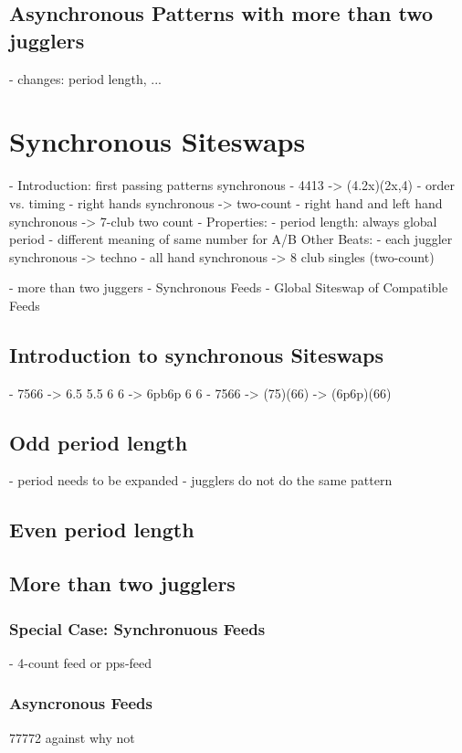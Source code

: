 \documentclass[a4paper,12pt,parskip=full]{scrreprt}
\begin{document}
	\section{Asynchronous Patterns with more than two jugglers}
	- changes: period length, ...
	\chapter{Synchronous Siteswaps}
	- Introduction: first passing patterns synchronous
	- 4413 -> (4.2x)(2x,4)
	- order vs. timing
	- right hands synchronous -> two-count
	- right hand and left hand synchronous -> 7-club two count
	- Properties:
	    - period length: always global period
	    - different meaning of same number for A/B
	Other Beats:
	- each juggler synchronous -> techno
	- all hand synchronous -> 8 club singles (two-count)
	
	- more than two juggers
	- Synchronous Feeds
	- Global Siteswap of Compatible Feeds
	
	\section{Introduction to synchronous Siteswaps}
	- 7566  ->  6.5  5.5  6  6  -> 6pb6p 6 6
	- 7566  -> (75)(66) -> (6p6p)(66)
	\section{Odd period length}
	- period needs to be expanded
	- jugglers do not do the same pattern
	
	\section{Even period length}
	\section{More than two jugglers}
	\subsection{Special Case: Synchronuous Feeds}
	- 4-count feed or pps-feed
	\subsection{Asyncronous Feeds}
	77772 against why not
	
	\listoftodos
	
\end{document}
